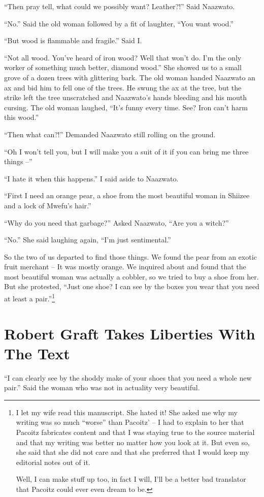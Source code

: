 ``Then pray tell, what could we possibly want? Leather?!'' Said Naazwato.

``No.'' Said the old woman followed by a fit of laughter, ``You want wood.''

``But wood is flammable and fragile.'' Said I.

``Not all wood. You've heard of iron wood? Well that won't do. I'm the only worker of something much better, diamond wood.''
She showed us to a small grove of a dozen trees with glittering bark. The old woman handed Naazwato an ax and bid him to fell one of the trees. He swung the ax at the tree, but the strike left the tree unscratched and Naazwato's hands bleeding and his mouth cursing. The old woman laughed,
``It's funny every time. See? Iron can't harm this wood.'' 

``Then what can?!'' Demanded Naazwato still rolling on the ground.

``Oh I won't tell you, but I will make you a suit of it if you can bring me three things --''

``I hate it when this happens.'' I said aside to Naazwato.

``First I need an orange pear, a shoe from the most beautiful woman in Shiizee and a lock of Mwefu's hair.''

``Why do you need that garbage?'' Asked Naazwato, ``Are you a witch?''

``No.'' She said laughing again, ``I'm just sentimental.''

So the two of us departed to find those things. We found the pear from an exotic fruit merchant -- It was mostly orange. We inquired about and found that the most beautiful woman was actually a cobbler, so we tried to buy a shoe from her. But she protested, ``Just one shoe? I can see by the boxes you wear that you need at least a pair.''\footnote{I let my wife read this manuscript. She hated it!
She asked me why my writing was so much ``worse'' than Pacoitz' -- I had to explain to her that Pacoitz fabricates content and that I was staying true to the source material and that my writing was better no matter how you look at it. But even so, she said that she did not care and that she preferred that I would keep my editorial notes out of it.

Well, I can make stuff up too, in fact I will, I'll be a better bad translator that Pacoitz could ever even dream to be.}

\chapter{Robert Graft Takes Liberties With The Text}
``I can clearly see by the shoddy make of your shoes that you need a whole new pair.'' Said the woman who was not in actuality very beautiful.

